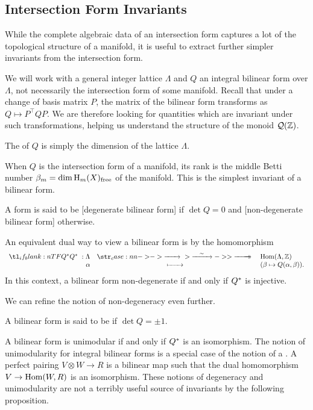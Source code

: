 \subsection{Intersection Form Invariants}\label{sec:intersection-form-invariants}

While the complete algebraic data of an intersection form captures a lot of the topological structure of a manifold, it is useful to extract further simpler invariants from the intersection form.

We will work with a general integer lattice $\Lambda$ and $Q$ an integral bilinear form over $\Lambda$, not necessarily the intersection form of some manifold. Recall that under a change of basis matrix $P$, the matrix of the bilinear form transforms as $Q\mapsto P^\intercal QP$. We are therefore looking for quantities which are invariant under such transformations, helping us understand the structure of the monoid $\mathcal{Q}(\mathbb{Z})$.

\begin{definition}
	The  of $Q$ is simply the dimension of the lattice $\Lambda$.
\end{definition}

When $Q$ is the intersection form of a manifold, its rank is the middle Betti number $\beta_m = \dim \operatorname{H}_m(X)_{\textrm{free}}$ of the manifold. This is the simplest invariant of a bilinear form.

\begin{definition}
	A form is said to be [degenerate bilinear form] if $\det Q=0$ and [non-degenerate bilinear form] otherwise.
\end{definition}

An equivalent dual way to view a bilinear form is by the homomorphism
\[
	\lkxfunc{Q^\d}{\Lambda}{\Hom(\Lambda, \Z)}{\alpha}{(\beta\mapsto Q(\alpha,\beta)).}
\]
In this context, a bilinear form non-degenerate if and only if $Q^*$ is injective.

We can refine the notion of non-degeneracy even further.
\begin{definition}
	A bilinear form is said to be  if $\det Q=\pm 1$.
\end{definition}
A bilinear form is unimodular if and only if $Q^*$ is an isomorphism. The notion of unimodularity for integral bilinear forms is a special case of the notion of a . A perfect pairing $V\otimes W \to R$ is a bilinear map such that the dual homomorphism $V \to \operatorname{Hom}(W, R)$ is an isomorphism. These notions of degeneracy and unimodularity are not a terribly useful source of invariants by the following proposition.

